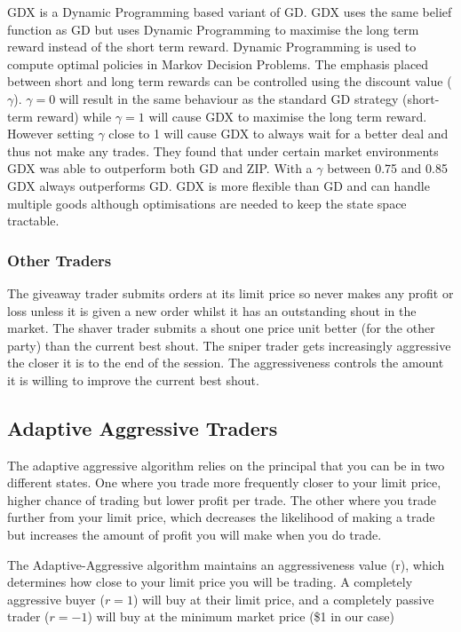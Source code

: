 \documentclass{acm_proc_article-sp}
\begin{document}
GDX\cite{gdx} is a Dynamic Programming based variant of GD.
GDX uses the same belief function as GD but uses Dynamic Programming to
maximise the long term reward instead of the short term reward.
Dynamic Programming is used to compute optimal policies in Markov Decision
Problems.
The emphasis placed between short and long term rewards can be controlled using
the discount value ($\gamma$).
$\gamma = 0$ will result in the same behaviour as the standard GD strategy
(short-term reward) while $\gamma = 1$ will cause GDX to maximise the long term
reward.
However setting $\gamma$ close to 1 will cause GDX to always wait for a better
deal and thus not make any trades.
They found that under certain market environments GDX was able to outperform
both GD and ZIP.
With a $\gamma$ between 0.75 and 0.85 GDX always outperforms GD.
GDX is more flexible than GD and can handle multiple goods although
optimisations are needed to keep the state space tractable.

\subsubsection{Other Traders}
The giveaway trader submits orders at its limit price so never makes any profit
or loss unless it is given a new order whilst it has an outstanding shout in
the market. The shaver trader submits a shout one price unit better (for the
other party) than the current best shout. The sniper trader gets increasingly
aggressive the closer it is to the end of the session. The aggressiveness
controls the amount it is willing to improve the current best shout.

\pagebreak %
\subsection{Adaptive Aggressive Traders} \label{sec:AA}

The adaptive aggressive algorithm relies on the principal that you can be in
two different states. One where you trade more frequently closer to your limit
price, higher chance of trading but lower profit per trade. The other where you
trade further from your limit price, which decreases the likelihood of making a
trade but increases the amount of profit you will make when you do trade.

The Adaptive-Aggressive algorithm maintains an aggressiveness value (r), which
determines how close to your limit price you will be trading. A completely
aggressive buyer ($r = 1$) will buy at their limit price, and a completely
passive trader ($r = -1$) will buy at the minimum market price (\$1 in our case)
\end{document}
